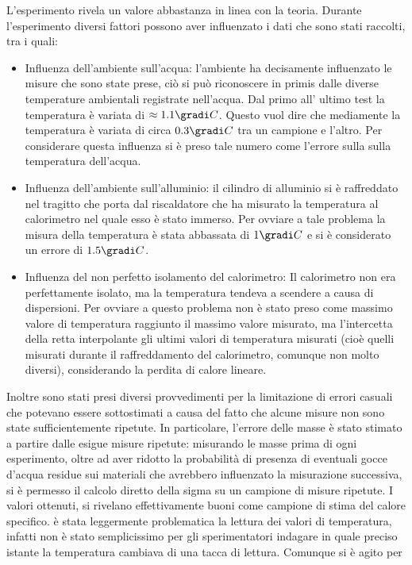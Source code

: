 L'esperimento rivela un valore abbastanza in linea con la teoria. Durante l'esperimento diversi fattori
possono aver influenzato i dati che sono stati raccolti, tra i quali:
\begin{itemize}
\item Influenza dell'ambiente sull'acqua: l'ambiente ha decisamente influenzato le misure che sono state prese, ciò si può
riconoscere in primis dalle diverse temperature ambientali registrate nell'acqua. Dal primo all'
ultimo test la temperatura è variata di $ \approx 1.1 \gradi C$. Questo vuol dire che mediamente la temperatura è 
variata di circa $0.3\gradi C$ tra un campione e l'altro. Per considerare questa influenza si 
è preso tale numero come l'errore sulla sulla temperatura dell'acqua.
\item Influenza dell'ambiente sull'alluminio: il cilindro di alluminio si è raffreddato nel tragitto che porta
 dal riscaldatore che ha misurato la temperatura al calorimetro nel quale esso è stato immerso. Per ovviare
 a tale problema la misura della temperatura è stata abbassata di $1 \gradi C$ e si è considerato un errore di 
$1.5 \gradi C$.
\item Influenza del non perfetto isolamento del calorimetro: Il calorimetro non era perfettamente isolato,
 ma la temperatura tendeva a scendere a causa di dispersioni. Per ovviare a questo problema non è stato preso come
 massimo valore di temperatura raggiunto il massimo valore misurato, ma l'intercetta della retta interpolante
 gli ultimi valori di temperatura misurati (cioè quelli misurati durante il raffreddamento del calorimetro, comunque
non molto diversi), considerando la perdita di calore lineare.
\end{itemize}
Inoltre sono stati presi diversi provvedimenti per la limitazione di errori casuali che potevano essere sottostimati
 a causa del fatto che alcune misure non sono state sufficientemente ripetute. In particolare, l'errore delle masse è
 stato stimato a partire dalle esigue misure ripetute: misurando le masse prima di ogni esperimento, oltre ad
 aver ridotto la probabilità di presenza di eventuali gocce d'acqua residue sui materiali che avrebbero influenzato la
 misurazione successiva, si è permesso il calcolo diretto della sigma su un campione di misure ripetute.
 I valori ottenuti, si rivelano effettivamente buoni come campione
 di stima del calore specifico.
 è stata leggermente problematica la lettura dei valori di temperatura, infatti non è stato semplicissimo per gli sperimentatori
 indagare in quale preciso istante la temperatura cambiava di una tacca di lettura. Comunque si è agito per
